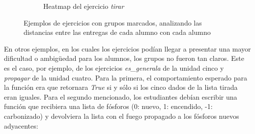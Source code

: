 \documentclass[11pt,a4paper,twoside,openany]{tesis}
\begin{document}
\begin{figure}[H]
\begin{subfigure}{0.45\textwidth}
        \caption{Heatmap del ejercicio \emph{tirar}}
        \label{fig:figura2}
    \end{subfigure}
    \caption{Ejemplos de ejercicios con grupos marcados, analizando las distancias entre las entregas de cada alumno con cada alumno}
    \label{fig:figuras_juntas}
\end{figure}

En otros ejemplos, en los cuales los ejercicios podían llegar a presentar una mayor dificultad o ambigüedad para los alumnos, los grupos no fueron tan claros. Este es el caso, por ejemplo, de los ejercicios \emph{es\_generala} de la unidad cinco y \emph{propagar} de la unidad cuatro. Para la primera, el comportamiento esperado para la función era que retornara \emph{True} si y sólo si los cinco dados de la lista tirada eran iguales. Para el segundo mencionado, los estudiantes debían escribir una función que recibiera una lista de fósforos (0: nuevo, 1: encendido, -1: carbonizado) y devolviera la lista con el fuego propagado a los fósforos nuevos adyacentes:
\end{document}
